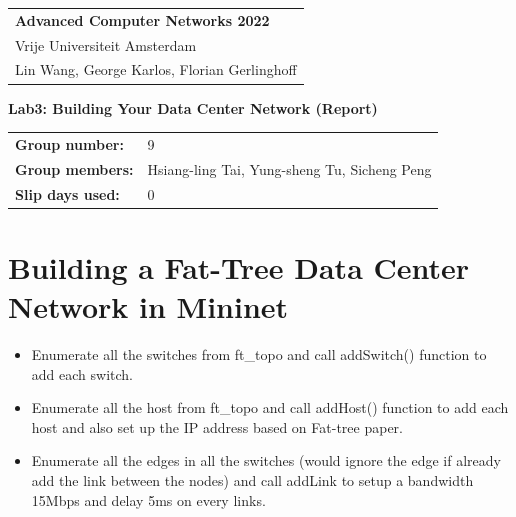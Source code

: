 \documentclass[a4paper,11pt]{article}
\begin{document}
\thispagestyle{empty} 

\begin{tabular}{@{}p{15.5cm}} 
{\bf Advanced Computer Networks 2022} \\
Vrije Universiteit Amsterdam  \\ Lin Wang, George Karlos, Florian Gerlinghoff\\
\hline 

\end{tabular} 

\vspace*{0.3cm} 

{\LARGE \bf Lab3: Building Your Data Center Network (Report)} 

\vspace*{0.3cm} 


\begin{tcolorbox}[sharp corners, colback=blue!5!white]
\begin{tabular}{@{}ll}
\textbf{Group number:} & 9 \\
\textbf{Group members:} & Hsiang-ling Tai, Yung-sheng Tu, Sicheng Peng \\
\textbf{Slip days used:} & 0 \\
\end{tabular}
\end{tcolorbox}

\vspace{0.4cm}


\section{Building a Fat-Tree Data Center Network in Mininet}
\begin{itemize}
    \item Enumerate all the switches from ft\_topo and call addSwitch() function to add each switch.
    \item Enumerate all the host from ft\_topo and call addHost() function to add each host and also set up the IP address based on Fat-tree paper.
    \item Enumerate all the edges in all the switches (would ignore the edge if already add the link between the nodes) and call addLink to setup a bandwidth 15Mbps and delay 5ms on every links.
\end{itemize}
\end{document}
